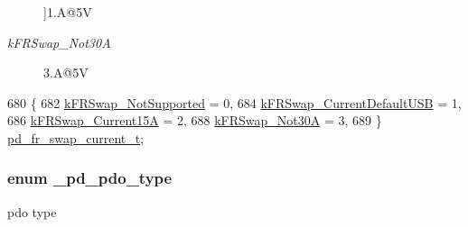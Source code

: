 \begin{Desc}
\begin{description}
{}]1.\-A@5\-V \item[{\em 
\hypertarget{group__usb__pd__stack_gga2cce3e21dbed22affd462b139a25889fa1068510e7639b8568a7686a2e3e13e14}{k\-F\-R\-Swap\-\_\-\-Not30\-A}\label{group__usb__pd__stack_gga2cce3e21dbed22affd462b139a25889fa1068510e7639b8568a7686a2e3e13e14}
}]3.\-A@5\-V \end{description}
\end{Desc}

\begin{DoxyCode}
680 \{
682     \hyperlink{group__usb__pd__stack_gga2cce3e21dbed22affd462b139a25889fa220c392960593725460ba31d5d918933}{kFRSwap\_NotSupported} = 0,
684     \hyperlink{group__usb__pd__stack_gga2cce3e21dbed22affd462b139a25889fa8c5c8b5dc2ba25ed160cfd3d6447e917}{kFRSwap\_CurrentDefaultUSB} = 1,
686     \hyperlink{group__usb__pd__stack_gga2cce3e21dbed22affd462b139a25889fa66d46326a35ff4e57816eaa439fd2eb9}{kFRSwap\_Current15A} = 2,
688     \hyperlink{group__usb__pd__stack_gga2cce3e21dbed22affd462b139a25889fa1068510e7639b8568a7686a2e3e13e14}{kFRSwap\_Not30A} = 3,
689 \} \hyperlink{group__usb__pd__stack_gaed8d775bac19feb90ff7a857e9768366}{pd\_fr\_swap\_current\_t};
\end{DoxyCode}
\hypertarget{group__usb__pd__stack_gab9f5d08f382b92b55a7f5f224a231dc9}{
\subsubsection[{\-\_\-pd\-\_\-pdo\-\_\-type}]{\setlength{\rightskip}{0pt plus 5cm}enum {\bf \-\_\-pd\-\_\-pdo\-\_\-type}}}\label{group__usb__pd__stack_gab9f5d08f382b92b55a7f5f224a231dc9}


pdo type 

